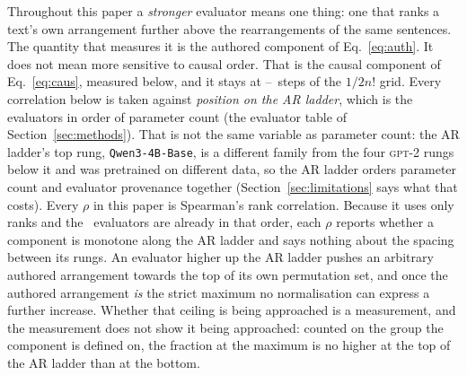 Throughout this paper a \emph{stronger} evaluator means one thing: one that
ranks a text's own arrangement further above the rearrangements of the same
sentences.  The quantity that measures it is the authored component of
Eq.~\eqref{eq:auth}.  It does not mean more sensitive to causal order.  That
is the causal component of Eq.~\eqref{eq:caus}, measured below, and it stays
at \CausalCompStepsMin--\CausalCompStepsMax\ steps of the $1/2n!$ grid.  Every correlation below is taken against
\emph{position on the AR ladder}, which is the evaluators in order of parameter
count (the evaluator table of Section~\ref{sec:methods}).  That is not the
same variable as parameter count: the AR ladder's top rung,
\texttt{Qwen3-4B-Base}, is a different family from the four \textsc{gpt-2}
rungs below it and was pretrained on different data, so the AR ladder orders
parameter count and evaluator provenance together
(Section~\ref{sec:limitations} says what that costs).  Every $\rho$ in this
paper is Spearman's rank correlation.  Because it uses only ranks and the
\TrendNEval\ evaluators are already in that order, each $\rho$ reports
whether a component is monotone along the AR ladder and says nothing about
the spacing between its rungs.  An evaluator higher up the AR ladder pushes an arbitrary authored
arrangement towards the top of its own permutation set, and once the
authored arrangement \emph{is} the strict maximum no normalisation can
express a further increase.  Whether that ceiling is being approached is a
measurement, and the measurement does not show it being approached:
counted on the group the component is defined on, the fraction at the
maximum is no higher at the top of the AR ladder than at the bottom.

